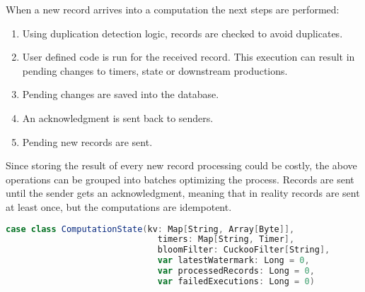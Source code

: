 When a new record arrives into a computation the next steps are performed:
\begin{enumerate}
  \item Using duplication detection logic, records are checked to avoid duplicates.
  \item User defined code is run for the received record. This execution can
    result in pending changes to timers, state or downstream productions.
  \item Pending changes are saved into the database.
  \item An acknowledgment is sent back to senders.
  \item Pending new records are sent.
\end{enumerate}

Since storing the result of every new record processing could be costly, the
above operations can be grouped into batches optimizing the process. Records are
sent until the sender gets an acknowledgment, meaning that in reality records
are sent at least once, but the computations are idempotent.

\begin{lstlisting}[language=scala, frame=trBL, label=code:computationState, float=ht, caption = {Alcaudon internal computation state}]
case class ComputationState(kv: Map[String, Array[Byte]],
                              timers: Map[String, Timer],
                              bloomFilter: CuckooFilter[String],
                              var latestWatermark: Long = 0,
                              var processedRecords: Long = 0,
                              var failedExecutions: Long = 0)
\end{lstlisting}

